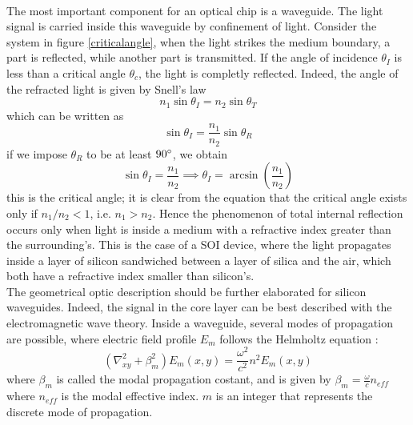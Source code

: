 \\The most important component for an optical chip is a waveguide. The light signal is carried inside this waveguide by confinement of light. Consider the system in figure \ref{criticalangle}, when the light strikes the medium boundary, a part is reflected, while another part is transmitted. If the angle of incidence $\theta_I$ is less than a critical angle $\theta_c$, the light is completly reflected. Indeed, the angle of the refracted light is given by Snell's law
\begin{equation}n_1 \sin \theta_I = n_2 \sin \theta_T\end{equation}
which can be written as
\begin{equation}\sin \theta_I = \frac{n_1}{n_2}\sin \theta_R\end{equation}
if we impose $\theta_R$ to be at least $90\degree$, we obtain
\begin{equation}\sin \theta_I = \frac{n_1}{n_2} \implies \theta_I = \arcsin\left(\frac{n_1}{n_2}\right) \end{equation}
this is the critical angle; it is clear from the equation that the critical angle exists only if $n_1/n_2<1$, i.e. $n_1>n_2$. Hence the phenomenon of total internal reflection occurs only when light is inside a medium with a refractive index greater than the surrounding's. This is the case of a SOI device, where the light propagates inside a layer of silicon sandwiched between a layer of silica and the air, which both have a refractive index smaller than silicon's.\\
The geometrical optic description should be further elaborated for silicon waveguides. Indeed, the signal in the core layer can be best described with the electromagnetic wave theory. Inside a waveguide, several modes of propagation are possible, where electric field profile $E_m$ follows the Helmholtz equation \cite{book:saleh}:
\begin{equation}(\nabla_{xy}^2 + \beta_m^2)E_m(x,y)= \frac{\omega^2}{c^2}n^2E_m(x,y)\end{equation}
where $\beta_m$ is called the modal propagation costant, and is given by $\beta_m = \frac{\omega}{c}n_{eff}$ where $n_{eff}$ is the modal effective index. $m$ is an integer that represents the discrete mode of propagation.\\
